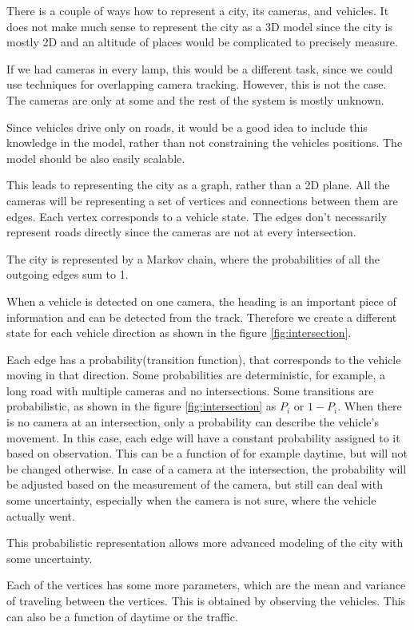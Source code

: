 \documentclass[a4paper,11pt,titlepage,twoside]{article}
\numberwithin{figure}{section}
\begin{document}
There is a couple of ways how to represent a city, its cameras, and vehicles. It does not make much sense to represent the city as a 3D model since the city is mostly 2D and an altitude of places would be complicated to precisely measure. 

If we had cameras in every lamp, this would be a different task, since we could use techniques for overlapping camera tracking. However, this is not the case. The cameras are only at some and the rest of the system is mostly unknown. 

Since vehicles drive only on roads, it would be a good idea to include this knowledge in the model, rather than not constraining the vehicles positions. The model should be also easily scalable. 

This leads to representing the city as a graph, rather than a 2D plane. All the cameras will be representing a set of vertices and connections between them are edges. Each vertex corresponds to a vehicle state. The edges don't necessarily represent roads directly since the cameras are not at every intersection. 

The city is represented by a Markov chain, where the probabilities of all the outgoing edges sum to 1.

When a vehicle is detected on one camera, the heading is an important piece of information and can be detected from the track. Therefore we create a different state for each vehicle direction as shown in the figure \ref{fig:intersection}. 

Each edge has a probability(transition function), that corresponds to the vehicle moving in that direction. Some probabilities are deterministic, for example, a long road with multiple cameras and no intersections. Some transitions are probabilistic, as shown in the figure \ref{fig:intersection} as $P_i$ or $1 - P_i$. When there is no camera at an intersection, only a probability can describe the vehicle's movement. In this case, each edge will have a constant probability assigned to it based on observation. This can be a function of for example daytime, but will not be changed otherwise. In case of a camera at the intersection, the probability will be adjusted based on the measurement of the camera, but still can deal with some uncertainty, especially when the camera is not sure, where the vehicle actually went. 

This probabilistic representation allows more advanced modeling of the city with some uncertainty.

Each of the vertices has some more parameters, which are the mean and variance of traveling between the vertices. This is obtained by observing the vehicles. This can also be a function of daytime or the traffic.
\end{document}
